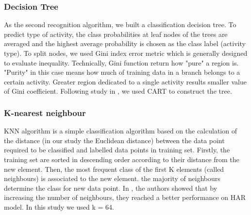 \documentclass[journal,article,submit,moreauthors,pdftex]{Definitions/mdpi}
\begin{document}

\subsubsection{Decision Tree}
\cite{shakya2018comparative}
As the second recognition algorithm, we built a classification decision tree. To predict type of activity, the class probabilities at leaf nodes of the trees are averaged and the highest average probability is chosen as the class label (activity type). To split nodes, we used Gini index error metric which is generally designed to evaluate inequality. Technically, Gini function return how "pure" a region is. "Purity" in this case means how much of training data in a branch belongs to a certain activity. Greater region dedicated to a single activity results smaller value of Gini coefficient. Following study in \cite{rosati2018comparison}, we used CART\cite{rutkowski2014cart} to construct the tree.

\subsubsection{K-nearest neighbour}
KNN algorithm is a simple classification algorithm based on the calculation of the distance
(in our study the Euclidean distance) between the data point required to be classified and labelled data points in training set.  Firstly, the training set are sorted in descending order according to their distance from the new element. Then, the most frequent class of the first K elements (called neighbours) is associated to the new element. the majority of neighbours determine the class for new data point. In \cite{kose2012online}, the authors showed that by increasing the number of neighbours, they reached a better performance on HAR model. In this study we used k = 64.
\end{document}
